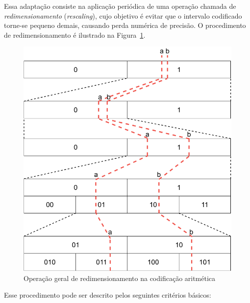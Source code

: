 Essa adaptação consiste na aplicação periódica de uma operação chamada de \textit{redimensionamento} (\textit{rescaling}), cujo objetivo é evitar que o intervalo codificado torne-se pequeno demais, causando perda numérica de precisão. O procedimento de redimensionamento é ilustrado na Figura~\ref{fig:DiagramasTCC-Aritmetic-Rescaling}.

\begin{figure}[ht]
	\centering
	\caption{Operação geral de redimensionamento na codificação aritmética}
	\label{fig:DiagramasTCC-Aritmetic-Rescaling}
	\includegraphics[width=13cm]{figuras/DiagramasTCC-Aritmetic-Rescaling}
\end{figure}


Esse procedimento pode ser descrito pelos seguintes critérios básicos:

